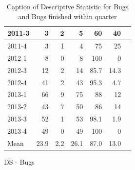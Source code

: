 \documentclass[UKenglish]{ifimaster}  %
\begin{document}
\begin{appendices}
\begin{table}[!htbp]
\begin{adjustwidth}{-2cm}{}
\begin{subfigure}[b]{0.4\textwidth}
{\begin{tabular}{ | l | r | r | r | r | r | r | }
2011-3 & 3 & 2 & 5 & 60 & 40 \\ \hline
2011-4 & 3 & 1 & 4 & 75 & 25 \\ \hline
2012-1 & 8 & 0 & 8 & 100 & 0 \\ \hline
2012-3 & 12 & 2 & 14 & 85.7 & 14.3 \\ \hline
2012-4 & 41 & 2 & 43 & 95.3 & 4.7 \\ \hline
2013-1 & 66 & 9 & 75 & 88 & 12 \\ \hline
2013-2 & 43 & 7 & 50 & 86 & 14 \\ \hline
2013-3 & 52 & 1 & 53 & 98.1 & 1.9 \\ \hline
2013-4 & 49 & 0 & 49 & 100 & 0 \\ \hline
Mean & 23.9&2.2&26.1&87.0&13.0 \\ \hline
\end{tabular}
}
\caption{DS - Bugs}
 \label{DS:FTPQ:6}
\end{subfigure}
\end{adjustwidth}
\caption[Optional caption for list of figures]{Caption of Descriptive Statistic for Bugs and Bugs finished within quarter}
\label{DS:6:5} %
\end{table}


 
 
 

\end{appendices}
\end{document}
